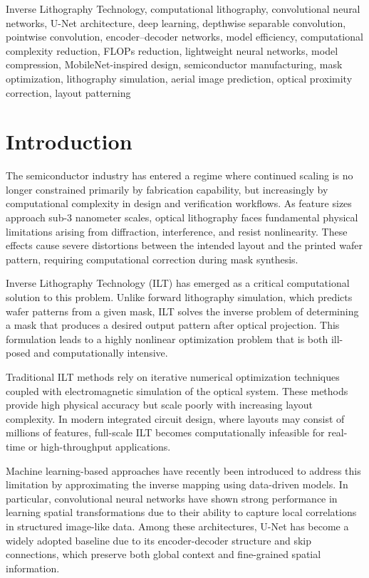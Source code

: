 \documentclass[conference]{IEEEtran}
\begin{document}
\begin{IEEEkeywords}
Inverse Lithography Technology, computational lithography, convolutional neural networks, U-Net architecture, deep learning, depthwise separable convolution, pointwise convolution, encoder–decoder networks, model efficiency, computational complexity reduction, FLOPs reduction, lightweight neural networks, model compression, MobileNet-inspired design, semiconductor manufacturing, mask optimization, lithography simulation, aerial image prediction, optical proximity correction, layout patterning
\end{IEEEkeywords}






\section{\textbf{Introduction}}

The semiconductor industry has entered a regime where continued scaling is no longer constrained primarily by fabrication capability, but increasingly by computational complexity in design and verification workflows. As feature sizes approach sub-3 nanometer scales, optical lithography faces fundamental physical limitations arising from diffraction, interference, and resist nonlinearity. These effects cause severe distortions between the intended layout and the printed wafer pattern, requiring computational correction during mask synthesis.

Inverse Lithography Technology (ILT) has emerged as a critical computational solution to this problem. Unlike forward lithography simulation, which predicts wafer patterns from a given mask, ILT solves the inverse problem of determining a mask that produces a desired output pattern after optical projection. This formulation leads to a highly nonlinear optimization problem that is both ill-posed and computationally intensive.

Traditional ILT methods rely on iterative numerical optimization techniques coupled with electromagnetic simulation of the optical system. These methods provide high physical accuracy but scale poorly with increasing layout complexity. In modern integrated circuit design, where layouts may consist of millions of features, full-scale ILT becomes computationally infeasible for real-time or high-throughput applications.

Machine learning-based approaches have recently been introduced to address this limitation by approximating the inverse mapping using data-driven models. In particular, convolutional neural networks have shown strong performance in learning spatial transformations due to their ability to capture local correlations in structured image-like data. Among these architectures, U-Net has become a widely adopted baseline due to its encoder-decoder structure and skip connections, which preserve both global context and fine-grained spatial information.
\end{document}
